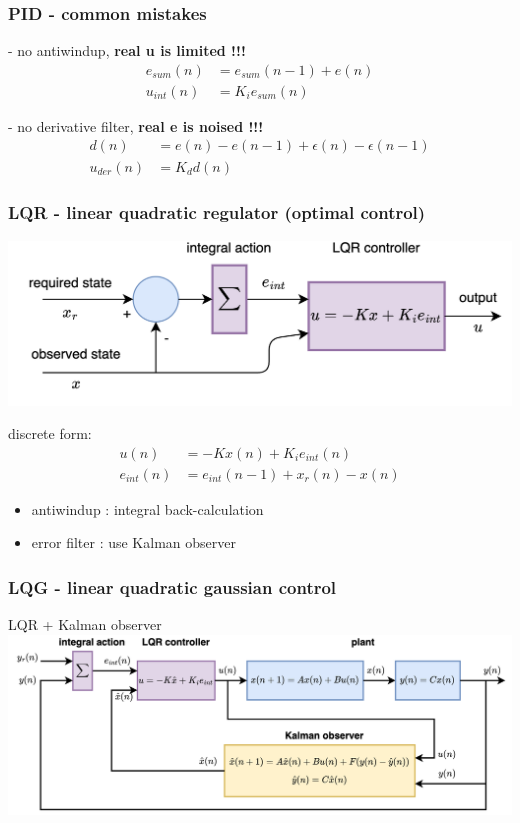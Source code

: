 \documentclass{beamer}
\begin{document}
\begin{frame}
  \frametitle{\bf PID - common mistakes}

  - no antiwindup, {\bf \color{red} real u is limited !!!}
  \begin{align*}
    e_{sum}(n) &= e_{sum}(n-1) + e(n) \\
    u_{int}(n)&= K_ie_{sum}(n)
  \end{align*}

  - no derivative filter, {\bf \color{red} real e is noised !!!}
  \begin{align*}
    d(n) &= e(n) - e(n-1) + \epsilon(n) - \epsilon(n-1) \\
    u_{der}(n)&= K_dd(n)
  \end{align*}
  
 
\end{frame}




\begin{frame}
  \frametitle{\bf LQR - linear quadratic regulator (optimal control)}

  {\centering \includegraphics[scale=0.8]{../diagrams/controll/control-lqr_disc.png}}

  discrete form: 
  \begin{align*}
    u(n) &= -Kx(n) + K_ie_{int}(n) \\
    e_{int}(n)&= e_{int}(n-1) + x_r(n) - x(n)
  \end{align*}
  
  \begin{itemize}
    \item antiwindup   : integral back-calculation
    \item error filter : use Kalman observer
  \end{itemize}

\end{frame}



\begin{frame}
  \frametitle{\bf LQG - linear quadratic gaussian control}
  LQR + Kalman observer
  {\centering \includegraphics[scale=0.6]{../diagrams/controll/control-lqg_discrete.png}}

\end{frame}
\end{document}
